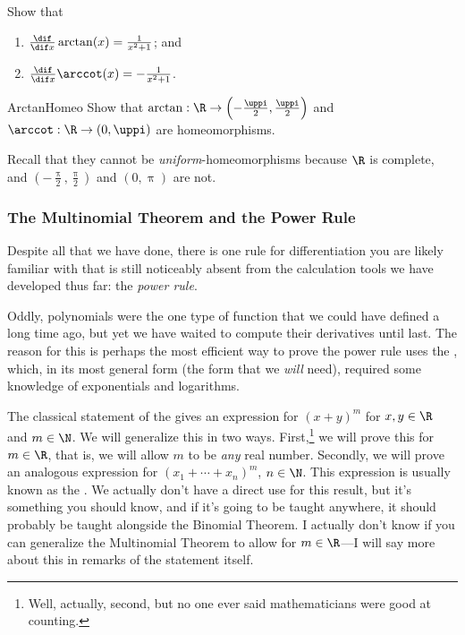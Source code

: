 \begin{exr}{}{}
Show that
\begin{enumerate}
\item $\frac{\dif}{\dif x}\arctan (x)=\frac{1}{x^2+1}$; and
\item $\frac{\dif}{\dif x}\arccot (x)=-\frac{1}{x^2+1}$.
\end{enumerate}
\end{exr}
\begin{exr}{}{ArctanHomeo}
Show that $\arctan :\R \rightarrow \left( -\frac{\uppi}{2},\frac{\uppi}{2}\right)$ and $\arccot :\R \rightarrow (0,\uppi )$ are homeomorphisms.
\begin{rmk}
Recall that they cannot be \emph{uniform}-homeomorphisms because $\R$ is complete, and $\left( -\frac{\uppi}{2},\frac{\uppi}{2}\right)$ and $(0,\uppi )$ are not.
\end{rmk}
\end{exr}

\subsubsection{The Multinomial Theorem and the Power Rule}

Despite all that we have done, there is one rule for differentiation you are likely familiar with that is still noticeably absent from the calculation tools we have developed thus far:  the \emph{power rule}.

Oddly, polynomials were the one type of function that we could have defined a long time ago, but yet we have waited to compute their derivatives until last.  The reason for this is perhaps the most efficient way to prove the power rule uses the \emph{}, which, in its most general form (the form that we \emph{will} need), required some knowledge of exponentials and logarithms.

The classical statement of the  gives an expression for $(x+y)^m$ for $x,y\in \R$ and $m\in \N$.  We will generalize this in two ways.  First,\footnote{Well, actually, second, but no one ever said mathematicians were good at counting.} we will prove this for $m\in \R$, that is, we will allow $m$ to be \emph{any} real number.  Secondly, we will prove an analogous expression for $(x_1+\cdots +x_n)^m$, $n\in \N$.  This expression is usually known as the \emph{}.  We actually don't have a direct use for this result, but it's something you should know, and if it's going to be taught anywhere, it should probably be taught alongside the Binomial Theorem.  I actually don't know if you can generalize the Multinomial Theorem to allow for $m\in \R$---I will say more about this in remarks of the statement itself.

